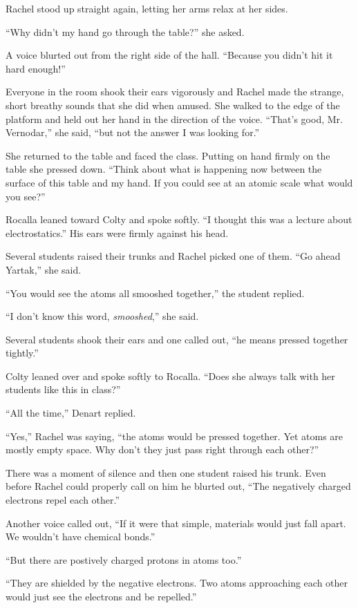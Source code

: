 Rachel stood up straight again, letting her arms relax at her sides.

``Why didn't my hand go through the table?'' she asked.

A voice blurted out from the right side of the hall. ``Because you didn't hit it hard enough!''

Everyone in the room shook their ears vigorously and Rachel made the strange, short breathy
sounds that she did when amused. She walked to the edge of the platform and held out her hand in
the direction of the voice. ``That's good, Mr. Vernodar,'' she said, ``but not the answer I was
looking for.''

She returned to the table and faced the class. Putting on hand firmly on the table she pressed
down. ``Think about what is happening now between the surface of this table and my hand. If you
could see at an atomic scale what would you see?''

Rocalla leaned toward Colty and spoke softly. ``I thought this was a lecture about
electrostatics.'' His ears were firmly against his head.

Several students raised their trunks and Rachel picked one of them. ``Go ahead Yartak,'' she
said.

``You would see the atoms all smooshed together,'' the student replied.

``I don't know this word, \textit{smooshed},'' she said.

Several students shook their ears and one called out, ``he means pressed together tightly.''

Colty leaned over and spoke softly to Rocalla. ``Does she always talk with her students like
this in class?''

``All the time,'' Denart replied.

``Yes,'' Rachel was saying, ``the atoms would be pressed together. Yet atoms are mostly empty
space. Why don't they just pass right through each other?''

There was a moment of silence and then one student raised his trunk. Even before Rachel could
properly call on him he blurted out, ``The negatively charged electrons repel each other.''

Another voice called out, ``If it were that simple, materials would just fall apart. We wouldn't
have chemical bonds.''

``But there are postively charged protons in atoms too.''

``They are shielded by the negative electrons. Two atoms approaching each other would just see
the electrons and be repelled.''


